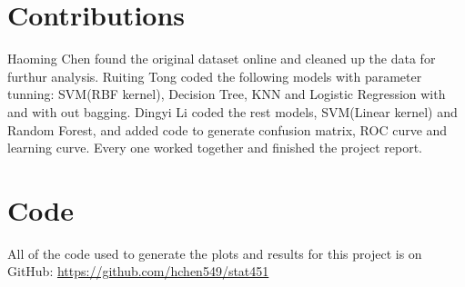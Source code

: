 \documentclass[10pt,twocolumn]{article}
\begin{document}
	
	
	\section{Contributions}
	Haoming Chen found the original dataset online and cleaned up the data for furthur analysis. Ruiting Tong coded the following models with parameter tunning: SVM(RBF kernel), Decision Tree, KNN and Logistic Regression with and with out bagging. Dingyi Li coded the rest models, SVM(Linear kernel) and Random Forest, and added code to generate confusion matrix, ROC curve and learning curve. Every one worked together and finished the project report.
	\section{Code}
	All of the code used to generate the plots and results for this project is on GitHub: \url{https://github.com/hchen549/stat451}
	
		
	
\end{document}
